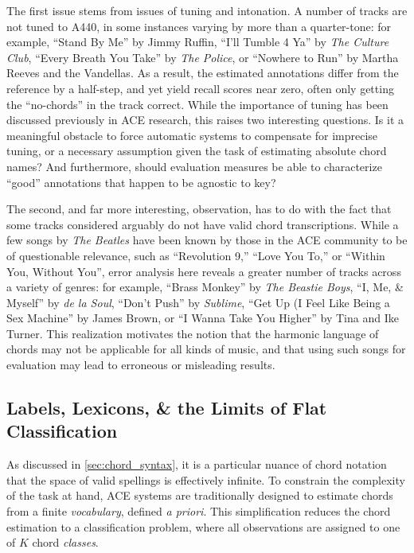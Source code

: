 \documentclass{article}
\begin{document}
The first issue stems from issues of tuning and intonation.
A number of tracks are not tuned to A440, in some instances varying by more than a quarter-tone:
for example, ``Stand By Me'' by Jimmy Ruffin, ``I'll Tumble 4 Ya'' by \emph{The Culture Club}, ``Every Breath You Take'' by \emph{The Police}, or ``Nowhere to Run'' by Martha Reeves and the Vandellas.
As a result, the estimated annotations differ from the reference by a half-step, and yet yield recall scores near zero, often only getting the ``no-chords'' in the track correct.
While the importance of tuning has been discussed previously in ACE research, this raises two interesting questions.
Is it a meaningful obstacle to force automatic systems to compensate for imprecise tuning, or a necessary assumption given the task of estimating absolute chord names?
And furthermore, should evaluation measures be able to characterize ``good'' annotations that happen to be agnostic to key?

The second, and far more interesting, observation, has to do with the fact that some tracks considered arguably do not have valid chord transcriptions.
While a few songs by \emph{The Beatles} have been known by those in the ACE community to be of questionable relevance, such as ``Revolution 9,'' ``Love You To,'' or ``Within You, Without You'', error analysis here reveals a greater number of tracks across a variety of genres:
for example, ``Brass Monkey'' by \emph{The Beastie Boys}, ``I, Me, \& Myself'' by \emph{de la Soul}, ``Don't Push'' by \emph{Sublime}, ``Get Up (I Feel Like Being a Sex Machine'' by James Brown, or ``I Wanna Take You Higher'' by Tina and Ike Turner.
This realization motivates the notion that the harmonic language of chords may not be applicable for all kinds of music, and that using such songs for evaluation may lead to erroneous or misleading results.


\subsection{Labels, Lexicons, \& the Limits of Flat Classification}

As discussed in \ref{sec:chord_syntax}, it is a particular nuance of chord notation that the space of valid spellings is effectively infinite.
To constrain the complexity of the task at hand, ACE systems are traditionally designed to estimate chords from a finite \emph{vocabulary}, defined \emph{a priori}.
This simplification reduces the chord estimation to a classification problem, where all observations are assigned to one of $K$ chord \emph{classes}.
\end{document}
